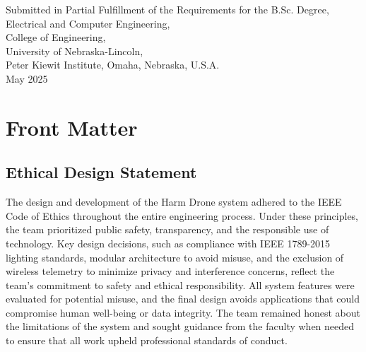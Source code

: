\documentclass[12pt]{article}
\begin{document}
\begin{titlepage}
\begin{center}
        \small Submitted in Partial Fulfillment of the Requirements for the B.Sc. Degree,\\
        \small Electrical and Computer Engineering,\\
        \small College of Engineering,\\
        \small University of Nebraska-Lincoln,\\
        \small Peter Kiewit Institute, Omaha, Nebraska, U.S.A.\\
        \small May 2025\\
    \end{center}
    \thispagestyle{empty}
\end{titlepage}

\newpage

\section*{Front Matter}

\subsection*{Ethical Design Statement}
The design and development of the Harm Drone system adhered to the IEEE Code of Ethics throughout the entire engineering process. Under these principles, the team prioritized public safety, transparency, and the responsible use of technology. Key design decisions, such as compliance with IEEE 1789-2015 lighting standards, modular architecture to avoid misuse, and the exclusion of wireless telemetry to minimize privacy and interference concerns, reflect the team's commitment to safety and ethical responsibility. All system features were evaluated for potential misuse, and the final design avoids applications that could compromise human well-being or data integrity. The team remained honest about the limitations of the system and sought guidance from the faculty when needed to ensure that all work upheld professional standards of conduct.
\end{document}
